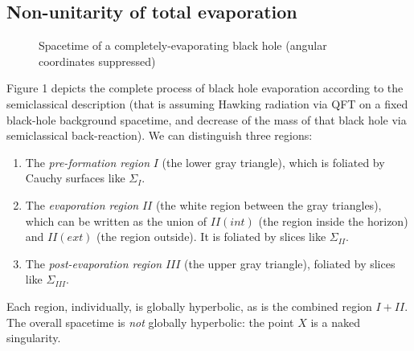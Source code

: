 \documentclass[12pt]{article}
\begin{document}
\subsection{Non-unitarity of total evaporation}


\begin{figure}
\caption{Spacetime of a completely-evaporating black hole (angular coordinates suppressed)}
\end{figure}

Figure 1 depicts the complete process of black hole evaporation according to the semiclassical description (that is assuming Hawking radiation via QFT on a fixed black-hole background spacetime, and decrease of the mass of that black hole via semiclassical back-reaction). We can distinguish three regions:
\begin{enumerate}
\item The \emph{pre-formation region} $I$ (the lower gray triangle), which is foliated by Cauchy surfaces like $\Sigma_I$.
\item The \emph{evaporation region} $II$ (the white region between the gray triangles), which can be written as the union of $II(int)$ (the region inside the horizon) and $II(ext)$ (the region outside). It is foliated by slices like $\Sigma_{II}$.
\item The \emph{post-evaporation region} $III$ (the upper gray triangle), foliated by slices like $\Sigma_{III}$.
\end{enumerate}
Each region, individually, is globally hyperbolic, as is the combined region $I+II$. The overall spacetime is \emph{not} globally hyperbolic: the point $X$ is a naked singularity.
\end{document}

